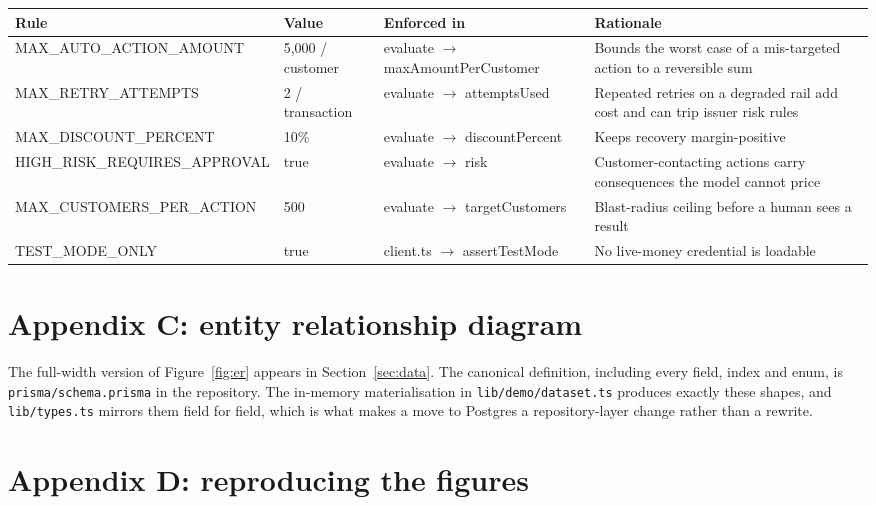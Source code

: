 \documentclass[10pt,twocolumn,a4paper]{article}
\newcommand{\rs}{\rupee}%
\newcommand{\rs}{\textrm{INR}\,}%
\newcommand{\code}[1]{\texttt{\small #1}}
\begin{document}
\begin{center}
\small
\begin{tabular}{@{}>{\scriptsize\ttfamily}l l >{\scriptsize\ttfamily}l p{}@{}}
\toprule
\textrm{\textbf{Rule}} & \textbf{Value} & \textrm{\textbf{Enforced in}} & \textbf{Rationale} \\
\midrule
MAX\_AUTO\_ACTION\_AMOUNT & \rs{}5{,}000 / customer & evaluate \textrm{$\rightarrow$} maxAmountPerCustomer & Bounds the worst case of a mis-targeted action to a reversible sum \\
MAX\_RETRY\_ATTEMPTS & 2 / transaction & evaluate \textrm{$\rightarrow$} attemptsUsed & Repeated retries on a degraded rail add cost and can trip issuer risk rules \\
MAX\_DISCOUNT\_PERCENT & 10\% & evaluate \textrm{$\rightarrow$} discountPercent & Keeps recovery margin-positive \\
HIGH\_RISK\_REQUIRES\_APPROVAL & true & evaluate \textrm{$\rightarrow$} risk & Customer-contacting actions carry consequences the model cannot price \\
MAX\_CUSTOMERS\_PER\_ACTION & 500 & evaluate \textrm{$\rightarrow$} targetCustomers & Blast-radius ceiling before a human sees a result \\
TEST\_MODE\_ONLY & true & client.ts \textrm{$\rightarrow$} assertTestMode & No live-money credential is loadable \\
\bottomrule
\end{tabular}
\end{center}

\section{Appendix C: entity relationship diagram}

The full-width version of Figure~\ref{fig:er} appears in Section~\ref{sec:data}.
The canonical definition, including every field, index and enum, is
\code{prisma/schema.prisma} in the repository. The in-memory materialisation in
\code{lib/demo/dataset.ts} produces exactly these shapes, and \code{lib/types.ts}
mirrors them field for field, which is what makes a move to Postgres a
repository-layer change rather than a rewrite.

\section{Appendix D: reproducing the figures}
\end{document}
